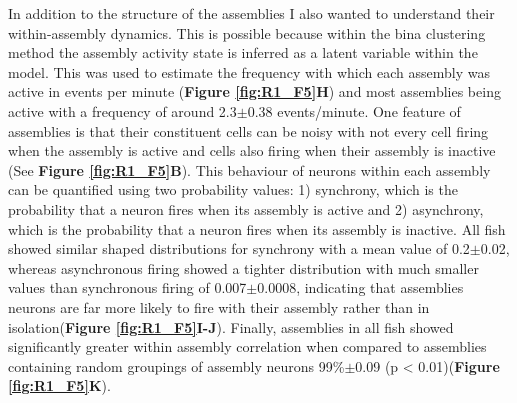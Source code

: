 In addition to the structure of the assemblies I also wanted to understand their within-assembly dynamics. This is possible because within the \gls{bina} clustering method the assembly activity state is inferred as a latent variable within the model. This was used to estimate the frequency with which each assembly was active in events per minute (\textbf{Figure \ref{fig:R1_F5}H}) and most assemblies being active with a frequency of around 2.3$\pm$0.38 events/minute. One feature of assemblies is that their constituent cells can be noisy with not every cell firing when the assembly is active and cells also firing when their assembly is inactive (See \textbf{Figure \ref{fig:R1_F5}B}). This behaviour of neurons within each assembly can be quantified using two probability values: 1) synchrony, which is the probability that a neuron fires when its assembly is active and 2) asynchrony, which is the probability that a neuron fires when its assembly is inactive. All fish showed similar shaped distributions for synchrony with a mean value of 0.2$\pm$0.02, whereas asynchronous firing showed a tighter distribution with much smaller values than synchronous firing of 0.007$\pm$0.0008, indicating that assemblies neurons are far more likely to fire with their assembly rather than in isolation(\textbf{Figure \ref{fig:R1_F5}I-J}). Finally, assemblies in all fish showed significantly greater within assembly correlation when compared to assemblies containing random groupings of assembly neurons 99\%$\pm$0.09 (p < 0.01)(\textbf{Figure \ref{fig:R1_F5}K}). 



